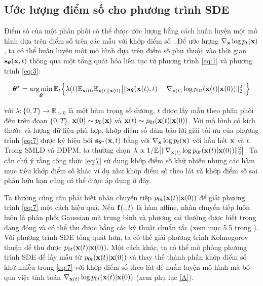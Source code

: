 \documentclass{article} %
\begin{document}
\subsection{Ước lượng điểm số cho phương trình SDE} \label{Estimating-Scores-For-The-SDE}

Điểm số của một phân phối có thể được ước lượng bằng cách huấn luyện một mô hình dựa trên điểm số trên các mẫu với khớp điểm số \citep{hyvarinen2005estimation,song2020sliced}. Để ước lượng $\nabla_{\bold{x}} \log p_t(\bold{x})$, ta có thể huấn luyện một mô hình dựa trên điểm số phụ thuộc vào thời gian $\bold{s}_{\boldsymbol{\theta}}(\bold{x}, t)$ thông qua một tổng quát hóa liên tục từ phương trình \ref{eq:1} và phương trình \ref{eq:3}:

\begin{equation} \label{eq:7}
    \boldsymbol{\theta}^{\ast} = \operatorname*{arg\,min}_{\boldsymbol{\theta}} \mathbb{E}_t \Big \lbrace  \lambda(t) \mathbb{E}_{\bold{x}(0)} \mathbb{E}_{\bold{x}(t) \vert \bold{x}(0)} \big \lbrack \lVert \bold{s}_{\boldsymbol{\theta}} (\bold{x}(t), t) - \nabla_{\bold{x}(t)} \log p_{0t} (\bold{x}(t) \vert \bold{x}(0)) \rVert_2^2 \big \lbrack \Big \rbrace
\end{equation}

với $\lambda: \lbrace 0, T \rbrace \rightarrow \mathbb{R}_{>0}$ là một hàm trọng số dương,
$t$ được lấy mẫu theo phân phối đều trên đoạn $\lbrace 0, T \rbrace$, $\bold{x}(0) \sim p_0 (\bold{x})$ và $\bold{x}(t) \sim p_{0t} (\bold{x}(t) \vert \bold{x}(0))$.
Với mô hình có kích thước và lượng dữ liệu phù hợp, khớp điểm số đảm bảo lời giải tối ưu của phương trình \ref{eq:7} được ký hiệu bởi $\bold{s}_{\boldsymbol{\theta}^{\ast}}(\bold{x}, t)$ bằng với $\nabla_{\bold{x}} \log p_t (\bold{x})$ với hầu hết $\bold{x}$ và $t$.
Trong SMLD và DDPM, ta thường chọn $\lambda \propto 1 / \mathbb{E} \big \lbrack \lVert \nabla_{\bold{x}(t)} \log p_{0t} (\bold{x}(t) \vert \bold{x}(0)) \rVert_2^2 \big \rbrack$.
Ta cần chú ý rằng công thức \ref{eq:7} sử dụng khớp điểm số khử nhiễu nhưng các hàm mục tiêu khớp điểm số khác ví dụ như khớp điểm số theo lát \citep{song2020sliced} và khớp điểm số sai phân hữu hạn \citep{pang2020efficient} cũng có thể được áp dụng ở đây.

Ta thường cũng cần phải biết nhân chuyển tiếp $p_{0t} (\bold{x}(t) \vert \bold{x}(0))$ để giải phương trình \ref{eq:7} một cách hiệu quả.
Nếu $\bold{f}(.,t)$ là hàm affine, nhân chuyển tiếp luôn luôn là phân phối Gaussian mà trung bình và phương sai thường được biết trong dạng đóng và có thể thu được bằng các kỹ thuật chuẩn tắc (xem mục 5.5  trong \citep{sarkka2019applied}).
Với phương trình SDE tổng quát hơn, ta có thể giải phương trình Kolmogorov thuận \citep{oksendal2003stochastic} để thu được $p_{0t} (\bold{x}(t) \vert \bold{x}(0))$.
Một cách khác, ta có thể mô phỏng phương trình SDE để lấy mẫu từ $p_{0t}(\bold{x}(t) \vert \bold{x}(0))$ và thay thế thành phần khớp điểm số khử nhiễu trong \ref{eq:7} với khớp điểm số theo lát để huấn luyện mô hình mà bỏ qua việc tính toán $\nabla_{\bold{x}(t)} \log p_{0t} (\bold{x}(t) \vert \bold{x}(0))$ (xem phụ lục \ref{A}).
\end{document}
